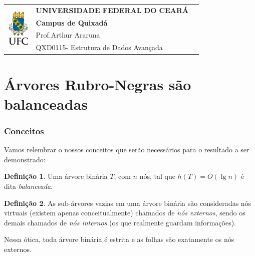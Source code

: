 \documentclass[11pt,twoside]{article}
\theoremstyle{definition}
\newtheorem{definition}{Definição}[section]
\def\disciplinacodigotext{QXD0115}
\def\disciplinanometext{Estrutura de Dados Avançada}
\def\provatitle{Árvores Rubro-Negras são balanceadas}
\def\professorabbrv{Prof.}
\def\professornometext{Arthur Araruna}
\begin{document}
\noindent
\begin{minipage}{\textwidth}
	\begin{tabularx}{\textwidth}{cXc}
		\multirow{4}{*}{\includegraphics[height=1.8cm]{../brasaoufc.pdf}} & {\bf UNIVERSIDADE FEDERAL DO CEARÁ}         & \multirow{3}{*}{} \\
		                                                                  & {\bf Campus de Quixadá}                     &                   \\
		                                                                  & \professorabbrv\enspace\professornometext   &                   \\
		                                                                  & \disciplinacodigotext - \disciplinanometext & {}                \\
	\end{tabularx}
\end{minipage}

\part*{\provatitle}

\section{Conceitos}

Vamos relembrar o nossos conceitos que serão necessários para o resultado a ser demonstrado:

\begin{definition}
	Uma árvore binária \( T \), com \( n \) nós, tal que \( h(T) = O(\lg n) \) é dita \emph{balanceada}.
\end{definition}

\begin{definition}
	As sub-árvores vazias em uma árvore binária são consideradas nós virtuais (existem apenas conceitualmente) chamados de \emph{nós externos}, sendo os demais chamados de \emph{nós internos} (os que realmente guardam informações).

	Nessa ótica, toda árvore binária é estrita e as folhas são exatamente os nós externos.
\end{definition}
\end{document}
